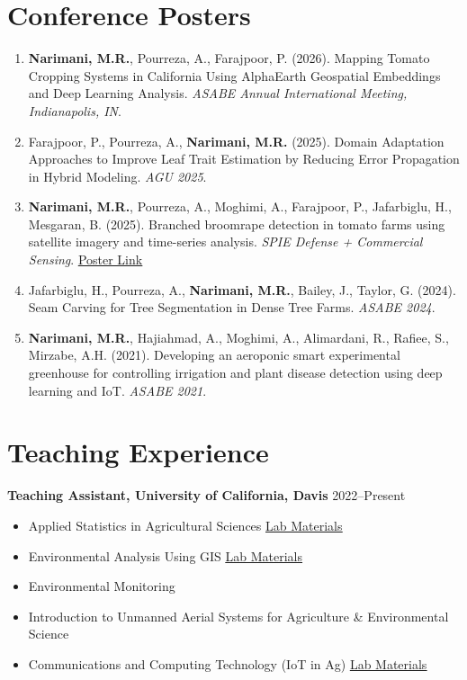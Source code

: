 \documentclass[11pt,a4paper]{article}
\begin{document}
\section{Conference Posters}

\begin{enumerate}
\item \textbf{Narimani, M.R.}, Pourreza, A., Farajpoor, P. (2026). Mapping Tomato Cropping Systems in California Using AlphaEarth Geospatial Embeddings and Deep Learning Analysis. \textit{ASABE Annual International Meeting, Indianapolis, IN}.

\item Farajpoor, P., Pourreza, A., \textbf{Narimani, M.R.} (2025). Domain Adaptation Approaches to Improve Leaf Trait Estimation by Reducing Error Propagation in Hybrid Modeling. \textit{AGU 2025}.

\item \textbf{Narimani, M.R.}, Pourreza, A., Moghimi, A., Farajpoor, P., Jafarbiglu, H., Mesgaran, B. (2025). Branched broomrape detection in tomato farms using satellite imagery and time-series analysis. \textit{SPIE Defense + Commercial Sensing}. \href{https://www.spiedigitallibrary.org/conference-proceedings-of-spie/13475/134750V/Leaf-spectral-reflectance-prediction-using-multihead-attention-neural-networks/10.1117/12.3061298.short}{\underline{Poster Link}}

\item Jafarbiglu, H., Pourreza, A., \textbf{Narimani, M.R.}, Bailey, J., Taylor, G. (2024). Seam Carving for Tree Segmentation in Dense Tree Farms. \textit{ASABE 2024}.

\item \textbf{Narimani, M.R.}, Hajiahmad, A., Moghimi, A., Alimardani, R., Rafiee, S., Mirzabe, A.H. (2021). Developing an aeroponic smart experimental greenhouse for controlling irrigation and plant disease detection using deep learning and IoT. \textit{ASABE 2021}.
\end{enumerate}

\section{Teaching Experience}

\noindent\textbf{Teaching Assistant, University of California, Davis} \hfill 2022--Present
\begin{itemize}
    \item Applied Statistics in Agricultural Sciences \href{https://mohammadrezanarimaniucdavis.github.io/PLS120-Statistics-Lab-Materials/}{\underline{Lab Materials}}
    \item Environmental Analysis Using GIS \href{https://geoailab.ucdavis.edu/}{\underline{Lab Materials}}
    \item Environmental Monitoring
    \item Introduction to Unmanned Aerial Systems for Agriculture \& Environmental Science
    \item Communications and Computing Technology (IoT in Ag) \href{https://mohammadrezanarimaniucdavis.github.io/TAE30-IoT-Lab-Materials/}{\underline{Lab Materials}}
\end{itemize}
\end{document}
